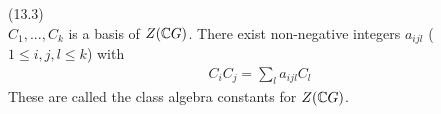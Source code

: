 \documentclass[a4paper]{article}
\begin{document}
\begin{prop} (13.3)\\
$C_1,...,C_k$ is a basis of $Z(\mathbb{C} G)$. There exist non-negative integers $a_{ijl}$ ($1 \leq i,j,l \leq k$) with 
\begin{equation*}
\begin{aligned}
C_i C_j = \sum_l a_{ijl} C_l
\end{aligned}
\end{equation*}
These are called the class algebra constants for $Z(\mathbb{C} G)$.
\end{prop}

\end{document}
